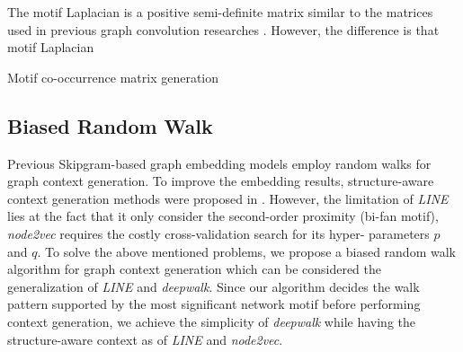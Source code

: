 \documentclass{article}
\theoremstyle{definition}
\begin{document}
The motif Laplacian is a positive semi-definite matrix
similar to the matrices used in previous graph convolution researches 
\cite{hammond2011wavelets,defferrard2016convolutional,gcn}. However,
the difference is that motif Laplacian 


\begin{algorithm}[h] \label{al:madj}
\caption{Motif co-occurrence matrix generation}
\end{algorithm}

\subsection{Biased Random Walk}

Previous Skipgram-based graph embedding models employ random
walks for graph context generation. To improve the embedding results,
structure-aware context generation methods were proposed in 
\cite{line,node2vec}. However, the limitation of \emph{LINE} lies at the 
fact that it only consider the second-order proximity (bi-fan motif),  
\emph{node2vec} requires the costly cross-validation search for its hyper-
parameters $p$ and $q$. To solve the above mentioned problems, we propose 
a biased random walk algorithm for graph context generation which can be 
considered the generalization of \emph{LINE} and \emph{deepwalk}. Since 
our algorithm decides the walk pattern supported by the most significant 
network motif before performing context generation, we achieve the 
simplicity of \emph{deepwalk} while having the structure-aware context as 
of \emph{LINE} and \emph{node2vec}.
\end{document}
